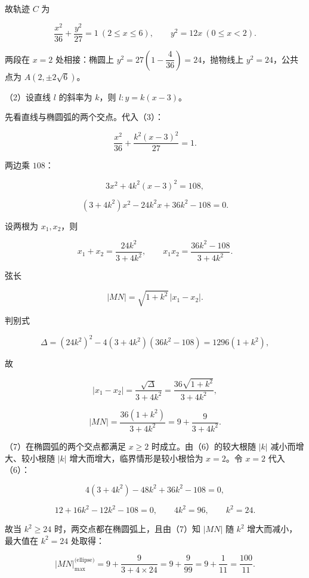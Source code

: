\begin{answer}
故轨迹 $C$ 为

\nopagebreak[4]
\[\frac{x^2}{36}+\frac{y^2}{27}=1\ (2\leqslant x\leqslant6),\qquad
y^2=12x\ (0\leqslant x<2).\]

两段在 $x=2$ 处相接：椭圆上 $y^2=27\left(1-\dfrac4{36}\right)=24$，抛物线上 $y^2=24$，公共点为 $A(2,\pm2\sqrt6)$。

（2）设直线 $l$ 的斜率为 $k$，则 $l:y=k(x-3)$。

先看直线与椭圆弧的两个交点。代入（3）：

\nopagebreak[4]
\[\frac{x^2}{36}+\frac{k^2(x-3)^2}{27}=1.\]

两边乘 $108$：

\nopagebreak[4]
\[3x^2+4k^2(x-3)^2=108,\]

\nopagebreak[4]
\[(3+4k^2)x^2-24k^2x+36k^2-108=0. \tag{6}\]

设两根为 $x_1,x_2$，则

\nopagebreak[4]
\[x_1+x_2=\frac{24k^2}{3+4k^2},\qquad
x_1x_2=\frac{36k^2-108}{3+4k^2}.\]

弦长

\nopagebreak[4]
\[|MN|=\sqrt{1+k^2}\,|x_1-x_2|.\]

判别式

\nopagebreak[4]
\[\Delta=(24k^2)^2-4(3+4k^2)(36k^2-108)=1296(1+k^2),\]

故

\nopagebreak[4]
\[|x_1-x_2|=\frac{\sqrt\Delta}{3+4k^2}=\frac{36\sqrt{1+k^2}}{3+4k^2},\]

\nopagebreak[4]
\[|MN|=\frac{36(1+k^2)}{3+4k^2}=9+\frac9{3+4k^2}. \tag{7}\]

（7）在椭圆弧的两个交点都满足 $x\geqslant2$ 时成立。由（6）的较大根随 $|k|$ 减小而增大、较小根随 $|k|$ 增大而增大，临界情形是较小根恰为 $x=2$。令 $x=2$ 代入（6）：

\nopagebreak[4]
\[4(3+4k^2)-48k^2+36k^2-108=0,\]

\nopagebreak[4]
\[12+16k^2-12k^2-108=0,\qquad 4k^2=96,\qquad k^2=24.\]

故当 $k^2\geqslant24$ 时，两交点都在椭圆弧上，且由（7）知 $|MN|$ 随 $k^2$ 增大而减小，最大值在 $k^2=24$ 处取得：

\nopagebreak[4]
\[|MN|_{\max}^{\text{(ellipse)}}=9+\frac9{3+4\times24}
=9+\frac9{99}=9+\frac1{11}=\frac{100}{11}. \tag{8}\]


\end{answer}
